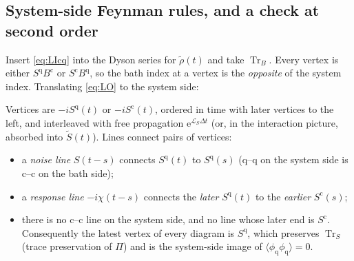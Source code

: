 \documentclass[11pt]{article}
\newcommand{\Tr}{\operatorname{Tr}}
\newcommand{\Lc}{\mathcal{L}}
\newcommand{\ee}{\mathrm{e}}
\newcommand{\cl}{\mathrm{c}}
\newcommand{\qu}{\mathrm{q}}
\newcommand{\avg}[1]{\langle#1\rangle}
\begin{document}
\subsection{System-side Feynman rules, and a check at second order}
\label{sec:feynman-rules}

Insert \cref{eq:LIcq} into the Dyson series for $\tilde\rho(t)$ and take $\Tr_B$. Every vertex
is either $S^\qu B^\cl$ or $S^\cl B^\qu$, so the bath index at a vertex is the
\emph{opposite} of the system index. Translating \cref{eq:LO} to the system side:

\begin{keybox}
Vertices are $-iS^\qu(t)$ or $-iS^\cl(t)$, ordered in time with later vertices to the left,
and interleaved with free propagation $\ee^{\Lc_S\Delta t}$ (or, in the interaction
picture, absorbed into $\tilde S(t)$). Lines connect pairs of vertices:
\begin{itemize}\itemsep0pt
\item a \emph{noise line} $S(t-s)$ connects $S^\qu(t)$ to $S^\qu(s)$ ($\qu$--$\qu$ on the system side
  is $\cl$--$\cl$ on the bath side);
\item a \emph{response line} $-i\chi(t-s)$ connects the \emph{later} $S^\qu(t)$ to the
  \emph{earlier} $S^\cl(s)$;
\item there is no $\cl$--$\cl$ line on the system side, and no line whose later end is
  $S^\cl$. Consequently the latest vertex of every diagram is $S^\qu$, which preserves
  $\Tr_S$ (trace preservation of $\Pi$) and is the system-side image of
  $\avg{\phi_\qu\phi_\qu}=0$.
\end{itemize}
\end{keybox}
\end{document}
